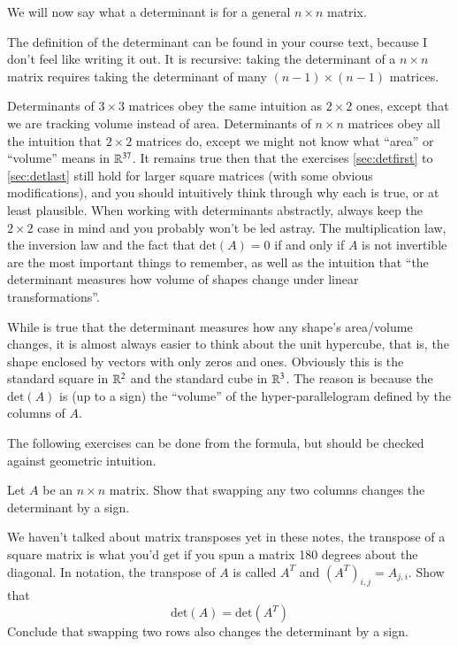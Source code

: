 We will now say what a determinant is for a general $n\times n$ matrix.
\begin{Def}[Determinant]
  The definition of the determinant can be found in your course text, because I don't feel like writing it out.
  It is recursive: taking the determinant of a $n\times n$ matrix requires taking the determinant of many $(n-1)\times(n-1)$ matrices.
\end{Def}
\begin{Remark}
  Determinants of $3\times 3$ matrices obey the same intuition as $2\times 2$ ones, except that we are tracking volume instead of area.  
  Determinants of $n\times n$ matrices obey all the intuition that $2\times 2$ matrices do, except we might not know what ``area'' or ``volume'' means in $\mathbb{R}^{37}$.
  It remains true then that the exercises \ref{sec:detfirst} to \ref{sec:detlast} still hold for larger square matrices (with some obvious modifications), and you should intuitively think through why each is true, or at least plausible. 
  When working with determinants abstractly, always keep the $2\times 2$ case in mind and you probably won't be led astray.
  The multiplication law, the inversion law and the fact that $\mbox{det}(A)=0$ if and only if $A$ is not invertible are the most important things to remember, as well
  as the intuition that ``the determinant measures how volume of shapes change under linear transformations''.
\end{Remark}
\begin{Remark}
  While is true that the determinant measures how any shape's area/volume changes, it is almost always easier to think about the unit hypercube, that is, the shape enclosed by vectors with only zeros and ones.
  Obviously this is the standard square in $\mathbb{R}^2$ and the standard cube in $\mathbb{R}^3$.
  The reason is because the $\mbox{det}(A)$ is (up to a sign) the ``volume'' of the hyper-parallelogram defined by the columns of $A$.  
\end{Remark}

The following exercises can be done from the formula, but should be checked against geometric intuition.  

\begin{EasyEx}
  \label{sec:swapdet}
  Let $A$ be an $n\times n$ matrix.
  Show that swapping any two columns changes the determinant by a sign.
\end{EasyEx}

\begin{Ex}
  \label{sec:dettrans}
  We haven't talked about matrix transposes yet in these notes, the transpose of a square matrix is what you'd get if you spun a matrix 180 degrees about the diagonal.
  In notation, the transpose of $A$ is called $A^T$ and $(A^T)_{i,j}=A_{j,i}$.  
  Show that 
  \[\mbox{det}(A)=\mbox{det}(A^T)\]
  Conclude that swapping two rows also changes the determinant by a sign.  
\end{Ex}

